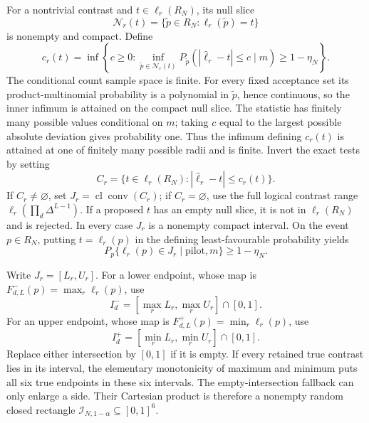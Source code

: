 For a nontrivial contrast and \(t\in\ell_r(R_N)\), its null slice
\[
 \mathcal N_r(t)=\{\widetilde p\in R_N:\ell_r(\widetilde p)=t\}
\]
is nonempty and compact.  Define
\[
 c_r(t)=\inf\left\{c\ge0:
 \inf_{\widetilde p\in\mathcal N_r(t)}
 P_{\widetilde p}\left(|\widehat\ell_r-t|\le c\mid m\right)
 \ge1-\eta_N\right\}.
\]
The conditional count sample space is finite.  For every fixed acceptance set its product-multinomial probability is a polynomial in \(\widetilde p\), hence continuous, so the inner infimum is attained on the compact null slice.  The statistic has finitely many possible values conditional on \(m\); taking \(c\) equal to the largest possible absolute deviation gives probability one.  Thus the infimum defining \(c_r(t)\) is attained at one of finitely many possible radii and is finite.  Invert the exact tests by setting
\[
 C_r=\{t\in\ell_r(R_N):|\widehat\ell_r-t|\le c_r(t)\}.
\]
If \(C_r\ne\varnothing\), set \(J_r=\operatorname{cl}\operatorname{conv}(C_r)\); if \(C_r=\varnothing\), use the full logical contrast range \(\ell_r(\prod_d\Delta^{L-1})\).  If a proposed \(t\) has an empty null slice, it is not in \(\ell_r(R_N)\) and is rejected.  In every case \(J_r\) is a nonempty compact interval.  On the event \(p\in R_N\), putting \(t=\ell_r(p)\) in the defining least-favourable probability yields
\[
 P_p\{\ell_r(p)\in J_r\mid\text{pilot},m\}\ge1-\eta_N.
\]

Write \(J_r=[L_r,U_r]\).  For a lower endpoint, whose map is \(F^-_{d,L}(p)=\max_r\ell_r(p)\), use
\[
 I_d^-=[\max_rL_r,\max_rU_r]\cap[0,1].
\]
For an upper endpoint, whose map is \(F^+_{d,L}(p)=\min_r\ell_r(p)\), use
\[
 I_d^+=[\min_rL_r,\min_rU_r]\cap[0,1].
\]
Replace either intersection by \([0,1]\) if it is empty.  If every retained true contrast lies in its interval, the elementary monotonicity of maximum and minimum puts all six true endpoints in these six intervals.  The empty-intersection fallback can only enlarge a side.  Their Cartesian product is therefore a nonempty random closed rectangle \(\mathcal I_{N,1-\alpha}\subseteq[0,1]^6\).

